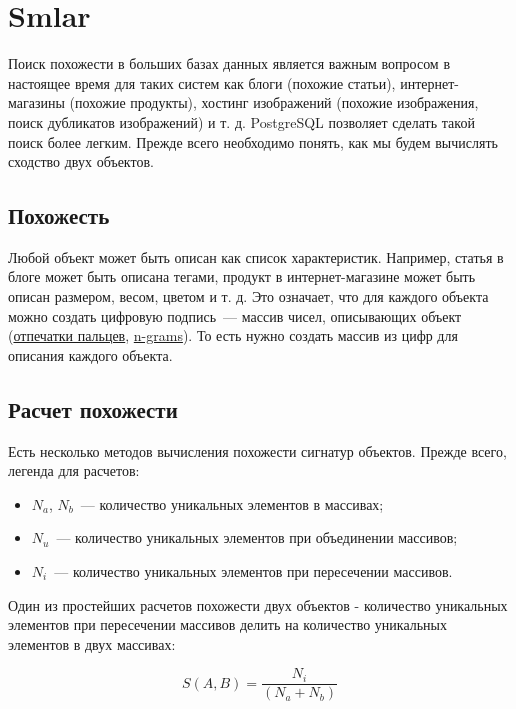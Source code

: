 \section{Smlar}

Поиск похожести в больших базах данных является важным вопросом в настоящее время для таких систем как блоги (похожие статьи), интернет-магазины (похожие продукты), хостинг изображений (похожие изображения, поиск дубликатов изображений) и т. д. PostgreSQL позволяет сделать такой поиск более легким. Прежде всего необходимо понять, как мы будем вычислять сходство двух объектов.

\subsection{Похожесть}

Любой объект может быть описан как список характеристик. Например, статья в блоге может быть описана тегами, продукт в интернет-магазине может быть описан размером, весом, цветом и т. д. Это означает, что для каждого объекта можно создать цифровую подпись~--- массив чисел, описывающих объект (\href{http://en.wikipedia.org/wiki/Fingerprint}{отпечатки пальцев}, \href{http://en.wikipedia.org/wiki/N-gram}{n-grams}). То есть нужно создать массив из цифр для описания каждого объекта.

\subsection{Расчет похожести}

Есть несколько методов вычисления похожести сигнатур объектов. Прежде всего, легенда для расчетов:

\begin{itemize}
  \item $N_a$, $N_b$~--- количество уникальных элементов в массивах;
  \item $N_u$~--- количество уникальных элементов при объединении массивов;
  \item $N_i$~--- количество уникальных элементов при пересечении массивов.
\end{itemize}

Один из простейших расчетов похожести двух объектов - количество уникальных элементов при пересечении массивов делить на количество уникальных элементов в двух массивах:

\begin{equation}
 \label{eq:smlar1}
 S(A,B) = \frac{N_{i}}{(N_{a}+N_{b})}
\end{equation}

